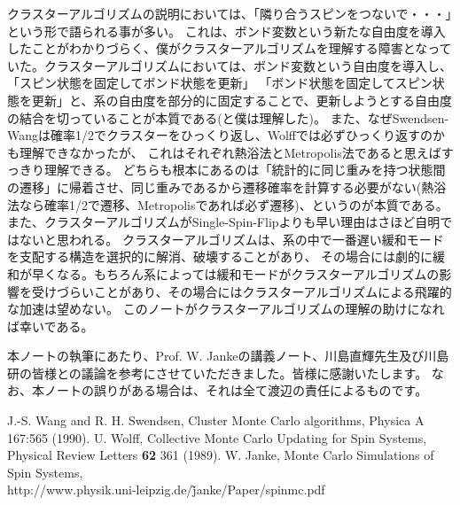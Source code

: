 \documentclass{jarticle}
\begin{document}
クラスターアルゴリズムの説明においては、「隣り合うスピンをつないで・・・」という形で語られる事が多い。
これは、ボンド変数という新たな自由度を導入したことがわかりづらく、僕がクラスターアルゴリズムを理解する障害となっていた。クラスターアルゴリズムにおいては、ボンド変数という自由度を導入し、「スピン状態を固定してボンド状態を更新」
「ボンド状態を固定してスピン状態を更新」と、系の自由度を部分的に固定することで、更新しようとする自由度の結合を切っていることが本質である(と僕は理解した)。
また、なぜSwendsen-Wangは確率1/2でクラスターをひっくり返し、Wolffでは必ずひっくり返すのかも理解できなかったが、
これはそれぞれ熱浴法とMetropolis法であると思えばすっきり理解できる。
どちらも根本にあるのは「統計的に同じ重みを持つ状態間の遷移」に帰着させ、同じ重みであるから遷移確率を計算する必要がない(熱浴法なら確率1/2で遷移、Metropolisであれば必ず遷移)、というのが本質である。
また、クラスターアルゴリズムがSingle-Spin-Flipよりも早い理由はさほど自明ではないと思われる。
クラスターアルゴリズムは、系の中で一番遅い緩和モードを支配する構造を選択的に解消、破壊することがあり、
その場合には劇的に緩和が早くなる。もちろん系によっては緩和モードがクラスターアルゴリズムの影響を受けづらいことがあり、その場合にはクラスターアルゴリズムによる飛躍的な加速は望めない。
このノートがクラスターアルゴリズムの理解の助けになれば幸いである。

本ノートの執筆にあたり、Prof. W. Jankeの講義ノート\cite{JankeNote}、川島直輝先生及び川島研の皆様との議論を参考にさせていただきました。皆様に感謝いたします。
なお、本ノートの誤りがある場合は、それは全て渡辺の責任によるものです。

\begin{thebibliography}{9}
   J.-S. Wang  and R. H. Swendsen, Cluster Monte Carlo algorithms, Physica A 167:565  (1990). 
   U. Wolff, Collective Monte Carlo Updating for Spin Systems, Physical Review Letters \textbf{62} 361 (1989).
   W. Janke, Monte Carlo Simulations of Spin Systems,\\ http://www.physik.uni-leipzig.de/\~janke/Paper/spinmc.pdf
\end{thebibliography}
\end{document}
